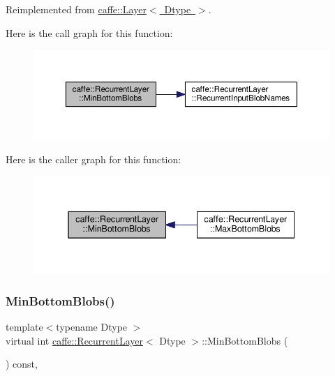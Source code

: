 Reimplemented from \mbox{\hyperlink{classcaffe_1_1_layer_aca3cb2bafaefda5d4760aaebd0b72def}{caffe\+::\+Layer$<$ Dtype $>$}}.

Here is the call graph for this function\+:
\nopagebreak
\begin{figure}[H]
\begin{center}
\leavevmode
\includegraphics[width=350pt]{classcaffe_1_1_recurrent_layer_ac31b705bc02d333ae768f7c2184fbfae_cgraph}
\end{center}
\end{figure}
Here is the caller graph for this function\+:
\nopagebreak
\begin{figure}[H]
\begin{center}
\leavevmode
\includegraphics[width=338pt]{classcaffe_1_1_recurrent_layer_ac31b705bc02d333ae768f7c2184fbfae_icgraph}
\end{center}
\end{figure}
\mbox{\label{classcaffe_1_1_recurrent_layer_ac31b705bc02d333ae768f7c2184fbfae}} 
\subsubsection{\texorpdfstring{Min\+Bottom\+Blobs()}{MinBottomBlobs()}\hspace{0.1cm}{\footnotesize\ttfamily [2/2]}}
{\footnotesize\ttfamily template$<$typename Dtype $>$ \\
virtual int \mbox{\hyperlink{classcaffe_1_1_recurrent_layer}{caffe\+::\+Recurrent\+Layer}}$<$ Dtype $>$\+::Min\+Bottom\+Blobs (\begin{DoxyParamCaption}{ }\end{DoxyParamCaption}) const\hspace{0.3cm}{\ttfamily [inline]}, {\ttfamily [virtual]}}



